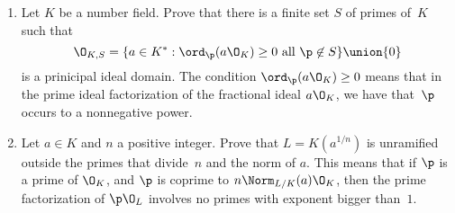 \begin{enumerate}


\item Let $K$ be a number field.  Prove that there is a finite
set $S$ of primes of~$K$ such that 
$$
 \O_{K,S} = \{a \in K^* :  \ord_\p(a\O_K) \geq 0 \text{ all } \p\not\in S\}
    \union\{0\}
$$
is a prinicipal ideal domain.  The condition $ \ord_\p(a\O_K) \geq 0$
means that in the prime ideal factorization of the fractional ideal
$a\O_K$, we have that~$\p$ occurs to a nonnegative power.  

\item Let $a \in K$ and $n$ a positive integer.  Prove that $L =
  K(a^{1/n})$ is unramified outside the primes that divide~$n$ and the
  norm of $a$.  This means that if $\p$ is a prime of $\O_K$, and $\p$
  is coprime to $n\Norm_{L/K}(a)\O_K$, then the prime factorization of
  $\p\O_L$ involves no primes with exponent bigger than~$1$.



\end{enumerate}


